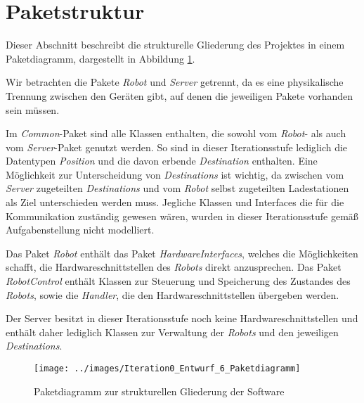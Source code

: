 \section{Paketstruktur}
Dieser Abschnitt beschreibt die strukturelle Gliederung des Projektes in einem Paketdiagramm, dargestellt in Abbildung \ref{Paketstruktur}.

Wir betrachten die Pakete \textit{Robot} und \textit{Server} getrennt, da es eine physikalische Trennung zwischen den Geräten gibt, auf denen die jeweiligen Pakete vorhanden sein müssen.

Im \textit{Common}-Paket sind alle Klassen enthalten, die sowohl vom \textit{Robot}- als auch vom \textit{Server}-Paket genutzt werden. So sind in dieser Iterationsstufe lediglich die Datentypen \textit{Position} und die davon erbende \textit{Destination} enthalten. Eine Möglichkeit zur Unterscheidung von \textit{Destinations} ist wichtig, da zwischen vom \textit{Server} zugeteilten \textit{Destinations} und vom \textit{Robot} selbst zugeteilten Ladestationen als Ziel unterschieden werden muss. Jegliche Klassen und Interfaces die für die Kommunikation zuständig gewesen wären, wurden in dieser Iterationsstufe gemäß Aufgabenstellung nicht modelliert.

Das Paket \textit{Robot} enthält das Paket \textit{HardwareInterfaces}, welches die Möglichkeiten schafft, die Hardwareschnittstellen des \textit{Robots} direkt anzusprechen. Das Paket \textit{RobotControl} enthält Klassen zur Steuerung und Speicherung des Zustandes des \textit{Robots}, sowie die \emph{Handler}, die den Hardwareschnittstellen übergeben werden.

Der Server besitzt in dieser Iterationsstufe noch keine Hardwareschnittstellen und enthält daher lediglich Klassen zur Verwaltung der \textit{Robots} und den jeweiligen \textit{Destinations}.

\begin{figure}[H]
\centering
\texttt{[image: ../images/Iteration0\_Entwurf\_6\_Paketdiagramm]}
\caption{Paketdiagramm zur strukturellen Gliederung der Software}
\label{Paketstruktur}
\end{figure}
